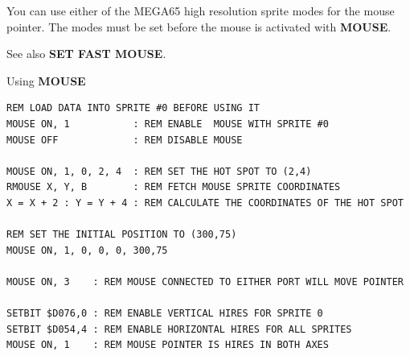 \begin{description}[leftmargin=2cm,style=nextline]
                  You can use either of the MEGA65 high resolution sprite modes for the mouse pointer. The modes must be set before the mouse is activated with {\bf MOUSE}.

                  See also {\bf SET FAST MOUSE}.

\item [Examples:] Using {\bf MOUSE}

\begin{tcolorbox}[colback=black,coltext=white]
\verbatimfont{\codefont}
\begin{verbatim}
REM LOAD DATA INTO SPRITE #0 BEFORE USING IT
MOUSE ON, 1           : REM ENABLE  MOUSE WITH SPRITE #0
MOUSE OFF             : REM DISABLE MOUSE

MOUSE ON, 1, 0, 2, 4  : REM SET THE HOT SPOT TO (2,4)
RMOUSE X, Y, B        : REM FETCH MOUSE SPRITE COORDINATES
X = X + 2 : Y = Y + 4 : REM CALCULATE THE COORDINATES OF THE HOT SPOT

REM SET THE INITIAL POSITION TO (300,75)
MOUSE ON, 1, 0, 0, 0, 300,75

MOUSE ON, 3    : REM MOUSE CONNECTED TO EITHER PORT WILL MOVE POINTER

SETBIT $D076,0 : REM ENABLE VERTICAL HIRES FOR SPRITE 0
SETBIT $D054,4 : REM ENABLE HORIZONTAL HIRES FOR ALL SPRITES
MOUSE ON, 1    : REM MOUSE POINTER IS HIRES IN BOTH AXES
\end{verbatim}
\end{tcolorbox}
\end{description}


\newpage
